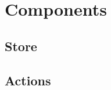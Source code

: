 \section{Components}
\label{sec:f-components}

\subsection{Store}
\label{ssec:fc-store}

\subsection{Actions}
\label{ssec:fc-actions}
